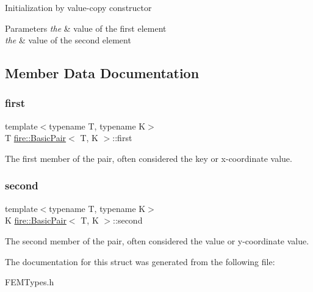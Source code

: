 Initialization by value-\/copy constructor 
\begin{DoxyParams}{Parameters}
{\em the} & value of the first element \\
\hline
{\em the} & value of the second element \\
\hline
\end{DoxyParams}


\subsection{Member Data Documentation}
\mbox{\label{a00768_a4e073a19bf2d3330d105d81a8febc4be}} 
\subsubsection{\texorpdfstring{first}{first}}
{\footnotesize\ttfamily template$<$typename T, typename K$>$ \\
T \hyperlink{a00768}{fire\+::\+Basic\+Pair}$<$ T, K $>$\+::first}

The first member of the pair, often considered the key or x-\/coordinate value. \mbox{\label{a00768_aecd2977e2fb903a5b106e4b5d7ab3bac}} 
\subsubsection{\texorpdfstring{second}{second}}
{\footnotesize\ttfamily template$<$typename T, typename K$>$ \\
K \hyperlink{a00768}{fire\+::\+Basic\+Pair}$<$ T, K $>$\+::second}

The second member of the pair, often considered the value or y-\/coordinate value. 

The documentation for this struct was generated from the following file\+:\begin{DoxyCompactItemize}
\item 
F\+E\+M\+Types.\+h\end{DoxyCompactItemize}
